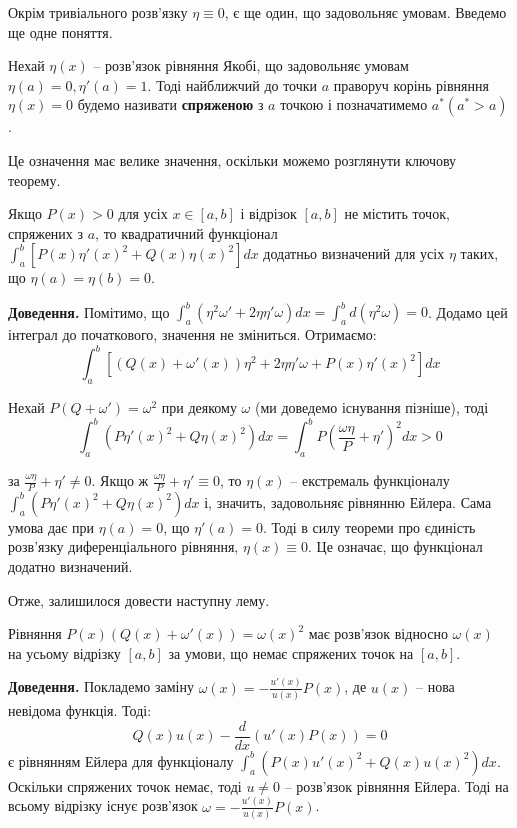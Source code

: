 \documentclass[14pt]{extarticle}
\newcommand{\<}{\langle}
\renewcommand{\>}{\rangle}
\theoremstyle{mystyle}{\newtheorem{definition}{Definition}[section]}
\theoremstyle{mystyle}{\newtheorem{proposition}[definition]{Proposition}}
\theoremstyle{mystyle}{\newtheorem{theorem}[definition]{Theorem}}
\theoremstyle{mystyle}{\newtheorem{lemma}[definition]{Lemma}}
\theoremstyle{mystyle}{\newtheorem{corollary}[definition]{Corollary}}
\theoremstyle{mystyle}{\newtheorem*{remark}{Remark}}
\theoremstyle{mystyle}{\newtheorem*{remarks}{Remarks}}
\theoremstyle{mystyle}{\newtheorem*{example}{Example}}
\theoremstyle{mystyle}{\newtheorem*{examples}{Examples}}
\theoremstyle{definition}{\newtheorem*{exercise}{Exercise}}
\theoremstyle{cstyle}{\newtheorem*{cthm}{}}
\theoremstyle{warn}
\begin{document}
Окрім тривіального розв'язку $\eta \equiv 0$, є ще один, що задовольняє умовам. Введемо ще одне поняття.

\begin{definition}
    Нехай $\eta(x)$ -- розв'язок рівняння Якобі, що задовольняє умовам $\eta(a)=0,\eta'(a)=1$. Тоді найближчий до точки $a$ праворуч корінь рівняння $\eta(x)=0$ будемо називати \textbf{спряженою} з $a$ точкою і позначатимемо $a^* (a^*>a)$.
\end{definition}

Це означення має велике значення, оскільки можемо розглянути ключову теорему.

\begin{theorem}
    Якщо $P(x) > 0$ для усіх $x \in [a,b]$ і відрізок $[a,b]$ не містить точок, спряжених з $a$, то квадратичний функціонал $\int_a^b [P(x)\eta'(x)^2+Q(x)\eta(x)^2]dx$ додатньо визначений для усіх $\eta$ таких, що $\eta(a)=\eta(b)=0$.
\end{theorem}

\textbf{Доведення.} Помітимо, що $\int_a^b (\eta^2\omega'+2\eta\eta'\omega)dx=\int_a^b d(\eta^2\omega)=0$. Додамо цей інтеграл до початкового, значення не зміниться. Отримаємо:
\begin{equation}
    \int_a^b\left[(Q(x)+\omega'(x))\eta^2 + 2\eta\eta'\omega + P(x)\eta'(x)^2\right]dx
\end{equation}

Нехай $P(Q+\omega')=\omega^2$ при деякому $\omega$ (ми доведемо існування пізніше), тоді
\begin{equation}
    \int_a^b (P\eta'(x)^2+Q\eta(x)^2)dx = \int_a^b P\left(\frac{\omega\eta}{P}+\eta'\right)^2dx > 0
\end{equation}

за $\frac{\omega\eta}{P}+\eta'\neq 0$. Якщо ж $\frac{\omega\eta}{P}+\eta'\equiv 0$, то $\eta(x)$ -- екстремаль функціоналу $\int_a^b (P\eta'(x)^2+Q\eta(x)^2)dx$ і, значить, задовольняє рівнянню Ейлера. Сама умова дає при $\eta(a)=0$, що $\eta'(a)=0$. Тоді в силу теореми про єдиність розв'язку диференціального рівняння, $\eta(x)\equiv 0$. Це означає, що функціонал додатно визначений.

Отже, залишилося довести наступну лему.
\begin{lemma}
    Рівняння $P(x)(Q(x)+\omega'(x))=\omega(x)^2$ має розв'язок відносно $\omega(x)$ на усьому відрізку $[a,b]$ за умови, що немає спряжених точок на $[a,b]$.
\end{lemma}

\textbf{Доведення.} Покладемо заміну $\omega(x)=-\frac{u'(x)}{u(x)}P(x)$, де $u(x)$ -- нова невідома функція. Тоді:
\begin{equation}
    Q(x)u(x) - \frac{d}{dx}(u'(x)P(x))=0
\end{equation}
є рівнянням Ейлера для функціоналу $\int_a^b (P(x)u'(x)^2+Q(x)u(x)^2)dx$. Оскільки спряжених точок немає, тоді $u \neq 0$ -- розв'язок рівняння Ейлера. Тоді на всьому відрізку існує розв'язок $\omega = -\frac{u'(x)}{u(x)}P(x)$. 
\end{document}
